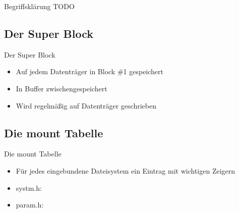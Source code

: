 \documentclass{beamer}
\begin{document}
\begin{frame}{Begriffsklärung}
    TODO
\end{frame}




\subsection{Der Super Block}

\begin{frame}{Der Super Block}
    \begin{itemize}
        \item Auf jedem Datenträger in Block \#1 gespeichert
        \item In Buffer zwischengespeichert
        \item Wird regelmäßig auf Datenträger geschrieben
    \end{itemize}

    \vfill

    
\end{frame}




\subsection{Die mount Tabelle}

\begin{frame}{Die mount Tabelle}
    \begin{itemize}
        \item Für jedes eingebundene Dateisystem ein Eintrag mit wichtigen Zeigern

        \vfill

        \item systm.h:
            \vspace{5pt}
            

        \vfill

        \item param.h:
            \vspace{5pt}
            

        \vfill
    \end{itemize}
\end{frame}
\end{document}

